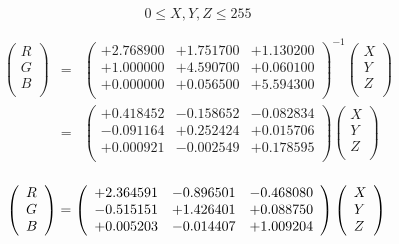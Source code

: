 \documentclass{article}
\begin{document}
\[ 0 \le X, Y, Z \le 255 \]
\pagebreak

\begin{eqnarray*} \left( \begin{array}{l} R \\ G \\ B \\ \end{array} \right) &=& \left( \begin{array}{lll} +2.768900 & +1.751700 & +1.130200 \\ +1.000000 & +4.590700 & +0.060100 \\ +0.000000 & +0.056500 & +5.594300 \\ \end{array} \right)^{-1} \left( \begin{array}{l} X \\ Y \\ Z \\ \end{array} \right)\\ &=& \left( \begin{array}{lll} +0.418452 & -0.158652 & -0.082834 \\ -0.091164 & +0.252424 & +0.015706 \\ +0.000921 & -0.002549 & +0.178595 \\ \end{array} \right) \left( \begin{array}{l} X \\ Y \\ Z \\ \end{array} \right) \\ \end{eqnarray*}
\pagebreak

\[ \left( \begin{array}{l} R \\ G \\ B \\ \end{array} \right) = \left( \begin{array}{lll} +2.364591 & -0.896501 & -0.468080 \\ -0.515151 & +1.426401 & +0.088750 \\ +0.005203 & -0.014407 & +1.009204 \\ \end{array} \right) \left( \begin{array}{l} X \\ Y \\ Z \\ \end{array} \right) \\ \]
\pagebreak
\end{document}
